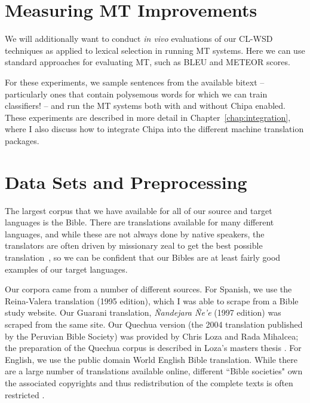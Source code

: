 \section{Measuring MT Improvements}
We will additionally want to conduct \emph{in vivo} evaluations of our CL-WSD
techniques as applied to lexical selection in running MT systems.  Here we can
use standard approaches for evaluating MT, such as BLEU and METEOR scores.

For these experiments, we sample sentences from the available bitext --
particularly ones that contain polysemous words for which we can train
classifiers! -- and run the MT systems both with and without Chipa enabled.
These experiments are described in more detail in
Chapter~\ref{chap:integration}, where I also discuss how to integrate Chipa
into the different machine translation packages.

\section{Data Sets and Preprocessing}
The largest corpus that we have available for all of our source and target
languages is the Bible. There are translations available for many different
languages, and while these are not always done by native speakers,
the translators are often driven by missionary zeal to get the best possible
translation~\cite{DBLP:journals/lre/ResnikOD99}, so we can be confident that
our Bibles are at least fairly good examples of our target languages.

Our corpora came from a number of different sources. For Spanish, we use the
Reina-Valera translation (1995 edition), which I was able to scrape from a
Bible study website. Our Guarani translation, \emph{Ñandejara Ñe'e} (1997
edition) was scraped from the same site.  Our Quechua version (the 2004
translation published by the Peruvian Bible Society) was provided by Chris Loza
and Rada Mihalcea; the preparation of the Quechua corpus is described in Loza's
masters thesis \cite{chrisloza}. For English, we use the public domain World
English Bible translation.
While there are a large number of translations available online, different
``Bible societies" own the associated copyrights and thus redistribution of the
complete texts is often restricted \cite{MAYER14.220.L14-1215}.

